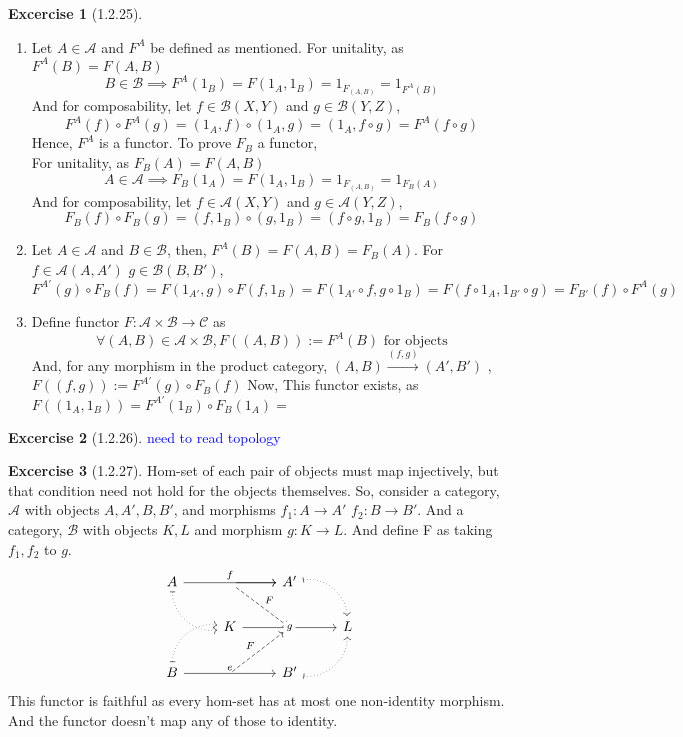 \documentclass{article}
\theoremstyle{definition}
\newtheorem*{excercise}{Excercise}
\begin{document}
\begin{excercise}[1.2.25] %
		\begin{enumerate}[label=(\alph*)]
			\item Let $A \in \mathcal{A} $ and $F^A$ be defined as mentioned.
				For unitality, as $F^A(B)=F(A,B)$  \[
				B \in \mathcal{B} \implies F^A(1_B)=F(1_A,1_B)=1_{F_{(A,B)}}=1_{F^A(B)}\]
				And for composability, let $f\in \mathcal{B}(X,Y)$ and
				$ g \in \mathcal{B}(Y,Z) $,
				\[F^A(f)\circ F^A(g)=(1_A,f)\circ(1_A,g)=(1_A,f\circ g)=F^A(f\circ g)\]
				Hence, $F^A$ is a functor. To prove $F_B$ a functor, \\
				For unitality, as $F_B(A)=F(A,B)$  \[
				A\in\mathcal{A}\implies F_B(1_A)=F(1_A,1_B)=1_{F_{(A,B)}}=1_{F_B(A)}\]
				And for composability, let $f\in \mathcal{A}(X,Y)$ and
				$ g \in \mathcal{A}(Y,Z) $,
				\[F_B(f) \circ  F_B(g) = (f,1_B) \circ (g,1_B) = (f \circ g,1_B) =F_B(f \circ g) \]
			\item Let  $A \in \mathcal{A} $ and $B \in \mathcal{B} $, then,
				$ F^A (B) = F(A,B) = F_B(A) $.
				For $f \in \mathcal{A}(A,A')$  $g \in\mathcal{B}(B,B')$,
				\[ F^{A'}(g) \circ F_B(f) = F(1_{A'},g) \circ F(f,1_B)
					=F(1_{A'} \circ  f , g \circ 1_B)
					=F(f \circ 1_A,1_{B'} \circ g)
				=F_{B'}(f) \circ  F^A(g)\]
			\item Define functor $F:\mathcal{A}\times\mathcal{B}\rightarrow\mathcal{C} $
				as
				\[ \forall (A,B) \in \mathcal{A} \times \mathcal{B},F((A,B)):=F^A(B)
				\text{ for objects} \]
				And, for any morphism in the product category,
				$(A,B)\xrightarrow{(f,g)} (A',B')$ ,
				$F((f,g)) := F^{A'}(g) \circ F_B(f)$
				Now, This functor exists, as
				$F((1_A,1_B))=F^{A'}(1_B) \circ F_B(1_A)= $
				\[  \]
		\end{enumerate}
\end{excercise}
\begin{excercise}[1.2.26] %
	\textcolor{blue}{need to read topology}
\end{excercise}
\begin{excercise}[1.2.27] %
	Hom-set of each pair of objects must map injectively, but that condition need not hold for the objects themselves.
	So, consider a category, $\mathcal{A}$ with objects $A,A',B,B'$, and morphisms $f_1:A\rightarrow A'$
	$f_2:B\rightarrow B'$. And a category, $\mathcal{B} $ with objects $K,L$ and morphism $g:K\rightarrow L$. And define F as taking $f_1,f_2$ to $g$.
	\[ \begin{tikzcd}
		A \arrow[rr, "f"] \arrow[rd, dotted, maps to, bend right=49] & {} \arrow[r] \arrow[rd, "F", dashed] & A' \arrow[rd, dotted, maps to, bend left=49] &   \\
									     & K \arrow[rr, "g" description]        & {}                                          & L \\
		B \arrow[rr, "e"] \arrow[ru, dotted, maps to, bend left=49]  & {} \arrow[ru, "F", dashed]           & B' \arrow[ru, dotted,maps to , bend right=49]         &
	\end{tikzcd}\]
	This functor is faithful as every hom-set has at most one non-identity morphism. And the  functor  doesn't map any of those to identity.

\end{excercise}
\end{document}
